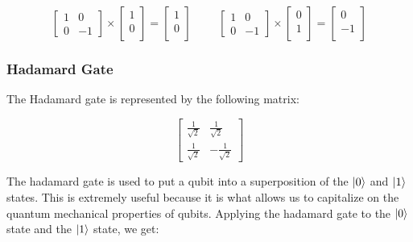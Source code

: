 \documentclass{article}
\begin{document}
\begin{center}
	\[
		\begin{bmatrix}
			1 & 0 \\
			0 & -1
		\end{bmatrix}
		\times
		\begin{bmatrix}
			1 \\
			0 \\
		\end{bmatrix}
		=
		\begin{bmatrix}
			1 \\
			0 \\
		\end{bmatrix}
		\hspace{1cm}
		\begin{bmatrix}
			1 & 0 \\
			0 & -1
		\end{bmatrix}
		\times
		\begin{bmatrix}
			0 \\
			1 \\
		\end{bmatrix}
		=
		\begin{bmatrix}
			0 \\
			-1 \\
		\end{bmatrix}
	\]
\end{center}

\subsubsection{Hadamard Gate}
\label{sec:hadamardgate}

The Hadamard gate is represented by the following matrix:

\begin{center}
	\[
		\begin{bmatrix}
			\frac{1}{\sqrt{2}} & \frac{1}{\sqrt{2}} \\
			\frac{1}{\sqrt{2}} & -\frac{1}{\sqrt{2}}
		\end{bmatrix}
	\]
\end{center}

The hadamard gate is used to put a qubit into a superposition of the $\ket{0}$ and $\ket{1}$ states. This is extremely useful because it is what allows us to capitalize on the
quantum mechanical properties of qubits. Applying the hadamard gate to the $\ket{0}$ state and the $\ket{1}$ state, we get:
\end{document}

